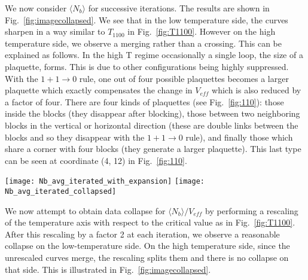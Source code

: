 \documentclass[../main.tex]{subfiles}
\begin{document}
We now consider $\langle N_b\rangle$  for successive iterations.  The results are shown in
Fig.~\ref{fig:imagecollapsed}. We see that in the low temperature side, the curves sharpen in a way similar to
$T_{1100}$ in Fig.~\ref{fig:T1100}. However on the high temperature side, we observe a merging rather than a crossing.
This can be explained as follows.  In the high T regime occasionally a single loop, the size of a plaquette, forms.
This is due to other configurations being highly suppressed. With the $1+1\rightarrow0$ rule, one out of four possible
plaquettes becomes a larger plaquette which exactly compensates the change in $V_{eff}$ which is also reduced by a
factor of four.  There are four kinds of plaquettes (see Fig.~\ref{fig:110}): those inside the blocks (they disappear
after blocking), those between two neighboring blocks in the vertical or horizontal direction (these are double links
between the blocks and so they disappear with the $1+1\rightarrow0$ rule), and finally those which share a corner with
four blocks (they generate a larger plaquette).  This last type can be seen at coordinate (4, 12) in
Fig.~\ref{fig:110}.
\begin{figure*}[htpb]
    \centering 
    \texttt{[image: Nb\_avg\_iterated\_with\_expansion]}\hfill%
    \texttt{[image: Nb\_avg\_iterated\_collapsed]}
    \caption{(a) Average number of bonds $\langle N_b\rangle$ vs. temperature
        $T$ under iterated blocking steps beginning with an initial lattice
        size of $L = 64$. The dashed black line illustrates the high
        temperature expansion, showing that the dominant configurations are
        those consisting of small, isolated plaquettes. (b) Average number of
    bonds $\langle N_b\rangle$ vs. the rescaled temperature $(T - 2.269) /
    L_{eff}$ under successive blocking steps. Iteration 0 represents the
    original lattice before blocking, with $L_{eff} = 64$. }
    \label{fig:imagecollapsed}
\end{figure*}

We now attempt to obtain data collapse for $\langle N_b \rangle/V_{eff}$ by performing a rescaling of the temperature
axis with respect to the critical value as in Fig.~\ref{fig:T1100}. After this rescaling by a factor 2 at each
iteration, we observe a reasonable collapse on the low-temperature side.  On the high temperature side, since the
unrescaled curves merge, the rescaling splits them and there is no collapse on that side. This is illustrated in
Fig.~\ref{fig:imagecollapsed}.  
\end{document}
